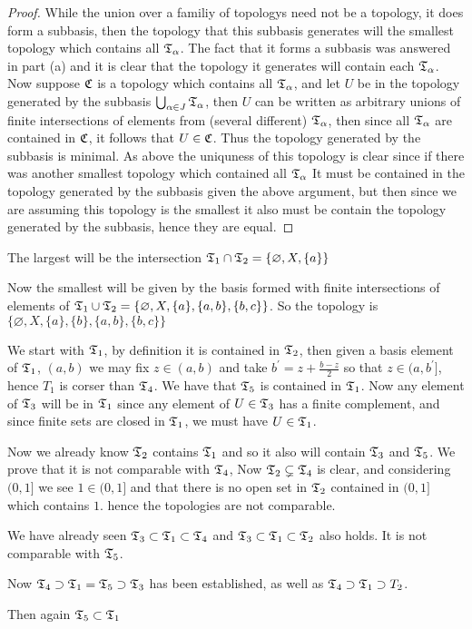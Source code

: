 \begin{alphaparts}
\begin{proof}
    While the union over a familiy of topologys need not be a topology, it does form a subbasis, then the topology that this subbasis generates will the smallest topology which contains all $\mathfrak{T}_\alpha$. The fact that it forms a subbasis was answered in part (a) and 
    it is clear that the topology it generates will contain each $\mathfrak{T}_\alpha$. Now suppose $\mathfrak{C}$ is a topology which contains all $\mathfrak{T}_\alpha$, and let $U$ be in the topology generated by the subbasis $\bigcup_{\alpha \in J} \mathfrak{T}_\alpha$, then $U$ can be written as 
    arbitrary unions of finite intersections of elements from (several different) $\mathfrak{T}_\alpha$, then since all $\mathfrak{T}_\alpha$ are contained in $\mathfrak{C}$, it follows that $U \in \mathfrak{C}$. Thus the topology generated by the subbasis is minimal. As above the uniquness of this topology is 
    clear since if there was another smallest topology which contained all $\mathfrak{T}_\alpha$ It must be contained in the topology generated by the subbasis given the above argument, but then since we are assuming this topology is the smallest it also must be contain the topology generated by 
    the subbasis, hence they are equal. 
\end{proof}

\questionpart
The largest will be the intersection $\mathfrak{T}_1 \cap \mathfrak{T}_2 = \{\varnothing, X, \{a\}\}$

Now the smallest will be given by the basis formed with finite intersections of elements of $\mathfrak{T}_1 \cup \mathfrak{T}_2 = \{\varnothing, X, \{a\}, \{a, b\}, \{b, c \}\}$. 
So the topology is $ \{\varnothing, X, \{a\}, \{b\}, \{a, b\}, \{b, c\}\}$


\question 
We start with $\mathfrak{T}_1$, by definition it is contained in $\mathfrak{T}_2$, then given a basis element of $\mathfrak{T}_1$, $(a, b)$ we may fix $z \in (a, b)$ and take $b^\prime = z + \frac{b-z}{2}$ so that $z \in (a, b^\prime]$, hence $T_1$ is corser than $\mathfrak{T}_4$. We have that $\mathfrak{T}_5$ is contained in $\mathfrak{T}_1$. 
Now any element of $\mathfrak{T}_3$ will be in $\mathfrak{T}_1$ since any element of $U \in \mathfrak{T}_3$ has a finite complement, and since finite sets are closed in $\mathfrak{T}_1$, we must have $U \in \mathfrak{T}_1$. 

Now we already know $\mathfrak{T}_2$ contains $\mathfrak{T}_1$ and so it also will contain $\mathfrak{T}_3$ and $\mathfrak{T}_5$. We prove that it is not comparable with $\mathfrak{T}_4$, Now $\mathfrak{T}_2 \subsetneq \mathfrak{T}_4$ is clear, and considering $(0, 1]$ we see $1 \in (0, 1]$ and that there is no open set in $\mathfrak{T}_2$ contained in $(0, 1]$ which contains $1$. 
hence the topologies are not comparable. 

We have already seen $\mathfrak{T}_3 \subset \mathfrak{T}_1 \subset \mathfrak{T}_4$ and $\mathfrak{T}_3 \subset \mathfrak{T}_1 \subset \mathfrak{T}_2$ also holds. It is not comparable with $\mathfrak{T}_5$. 

Now $\mathfrak{T}_4 \supset \mathfrak{T}_1 = \mathfrak{T}_5 \supset \mathfrak{T}_3$ has been established, as well as $\mathfrak{T}_4 \supset \mathfrak{T}_1 \supset T_2$. 


Then again $\mathfrak{T}_5 \subset \mathfrak{T}_1$
\end{alphaparts}

